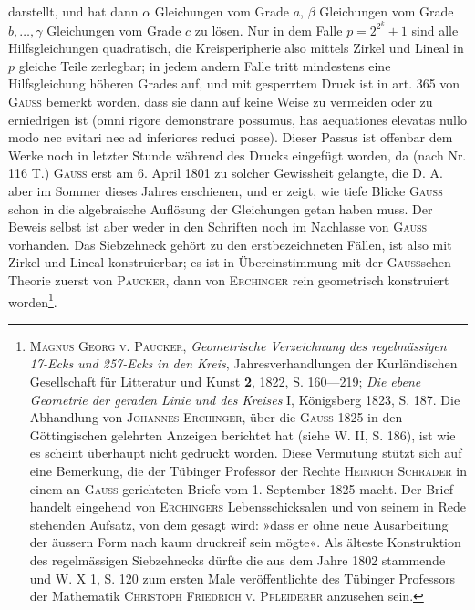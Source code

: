 darstellt, und hat dann \(\alpha\) Gleichungen vom Grade \(a\), \(\beta\) Gleichungen vom Grade \(b,\ldots,\gamma\) Gleichungen vom Grade \(c\) zu lösen. Nur in dem Falle \(p=2^{2^k}+1\) sind alle Hilfsgleichungen quadratisch, die Kreisperipherie also mittels Zirkel und Lineal in \(p\) gleiche Teile zerlegbar; in jedem andern Falle tritt mindestens eine Hilfsgleichung höheren Grades auf, und mit gesperrtem Druck ist in art. 365 von \textsc{Gauss} bemerkt worden, dass sie dann auf keine Weise zu vermeiden oder zu erniedrigen ist (omni rigore demonstrare possumus, has aequationes elevatas nullo modo nec evitari nec ad inferiores reduci posse). Dieser Passus ist offenbar dem Werke noch in letzter Stunde während des Drucks eingefügt worden, da (nach Nr. 116 T.) \textsc{Gauss} erst am 6. April 1801 zu solcher Gewissheit gelangte, die D. A. aber im Sommer dieses Jahres erschienen, und er zeigt, wie tiefe Blicke \textsc{Gauss} schon in die algebraische Auflösung der Gleichungen getan haben muss. Der Beweis selbst ist aber weder in den Schriften noch im Nachlasse von \textsc{Gauss} vorhanden. Das Siebzehneck gehört zu den erstbezeichneten Fällen, ist also mit Zirkel und Lineal konstruierbar; es ist in Übereinstimmung mit der \textsc{Gauss}schen Theorie zuerst von \textsc{Paucker}, dann von \textsc{Erchinger} rein geometrisch konstruiert worden\footnote{\textsc{Magnus Georg v. Paucker}, \textit{Geometrische Verzeichnung des regelmässigen 17-Ecks und 257-Ecks in den Kreis}, Jahresverhandlungen der Kurländischen Gesellschaft für Litteratur und Kunst \textbf{2}, 1822, S. 160—219; \textit{Die ebene Geometrie der geraden Linie und des Kreises} I, Königsberg 1823, S. 187. Die Abhandlung von \textsc{Johannes Erchinger}, über die \textsc{Gauss} 1825 in den Göttingischen gelehrten Anzeigen berichtet hat (siehe W. II, S. 186), ist wie es scheint überhaupt nicht gedruckt worden. Diese Vermutung stützt sich auf eine Bemerkung, die der Tübinger Professor der Rechte \textsc{Heinrich Schrader} in einem an \textsc{Gauss} gerichteten Briefe vom 1. September 1825 macht. Der Brief handelt eingehend von \textsc{Erchingers} Lebensschicksalen und von seinem in Rede stehenden Aufsatz, von dem gesagt wird: »dass er ohne neue Ausarbeitung der äussern Form nach kaum druckreif sein mögte«. Als älteste Konstruktion des regelmässigen Siebzehnecks dürfte die aus dem Jahre 1802 stammende und W. X 1, S. 120 zum ersten Male veröffentlichte des Tübinger Professors der Mathematik \textsc{Christoph Friedrich v. Pfleiderer} anzusehen sein.}.
